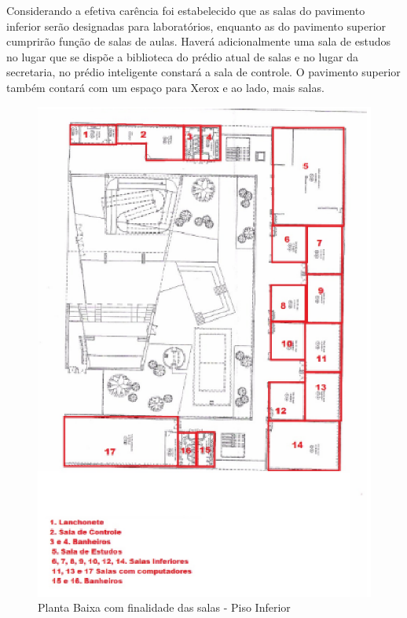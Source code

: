 Considerando a efetiva carência foi estabelecido que as salas do pavimento inferior serão designadas para laboratórios, enquanto as do pavimento superior cumprirão função de salas de aulas. Haverá adicionalmente uma sala de estudos no lugar que se dispõe a biblioteca do prédio atual de salas e no lugar da secretaria, no prédio inteligente constará a sala de controle. O pavimento superior também contará com um espaço para Xerox e ao lado, mais salas.

\begin{figure}[!h]
  \centering
  \includegraphics[keepaspectratio=true,scale=1]{figuras/plantabaixa1.eps}
  \caption{Planta Baixa com finalidade das salas - Piso Inferior}
  \label{fig:planta_salas_inferior}
\end{figure}

